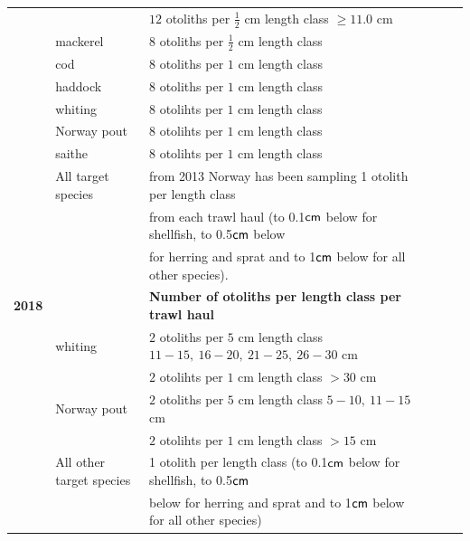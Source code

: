 \documentclass[a4paper 12pt]{article}
\numberwithin{equation}{section}
\newcommand{\cm}{\textnormal{\sffamily cm}\xspace}
\begin{document}
\begin{appendices}
\begin{small}
\begin{table}[h!]
\begin{tabularx}{\linewidth}{r l l l l X}
              & & $12$  otoliths per $\frac{1}{2}$ cm length class  $\geq 11.0$ cm\\[0.8ex]
& mackerel      & $8$  otoliths per $\frac{1}{2}$ cm length class \\[0.8ex]
& cod       	  & $8$  otoliths per $1$ cm length class\\[0.8ex]
&haddock   	  & $8$  otoliths per $1$ cm length class \\[0.8ex]
&whiting    	  & $8$  otolihts per $1$ cm length class \\[0.8ex]
&Norway pout   & $8$  otolihts per $1$ cm length class\\[0.8ex]
&saithe        & $8$  otolihts per $1$ cm length class \\[2ex] 
& All target species      & from 2013 Norway has been sampling 1 otolith per length class  \\[0.7ex] 
&& from each trawl haul (to 0.1$\cm$ below for shellfish, to 0.5$\cm$ below  \\[0.7ex] 
&& for herring and sprat and to 1$\cm$ below for all other species).\\[2.7ex] 

{\bf 2018} & & {\bf Number of otoliths per length class per trawl haul}  \\[1.8ex]
& whiting & $2$  otoliths per $5$ cm length class $11 -15, \ 16-20, \ 21-25, \ 26-30$ cm \\[1.8ex]
             & & $2$  otolihts per $1$ cm length class $> 30$ cm\\[1.5ex]
 & Norway pout & $2$  otoliths per $5$ cm length class $5 -10, \ 11-15$ cm\\[0.8ex]
               & & $2$  otolihts per $1$ cm length class $> 15$ cm\\[1.8ex]
 & All other target species  &  1 otolith per length class (to 0.1$\cm$   below for shellfish, to 0.5$\cm$ \\[0.8ex]
 && below for herring and sprat and to 1$\cm$ below for all other species)\\[0.7ex] 
\bottomrule         
\end{tabularx}
\end{table}
\end{small}


\end{appendices}
\end{document}
